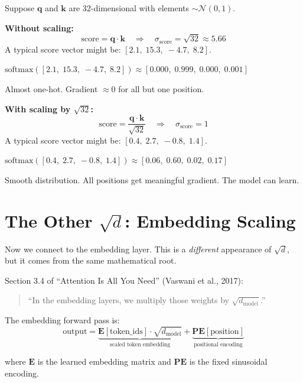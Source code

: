 \documentclass[11pt, a4paper]{article}
\begin{document}
\begin{application}[Numerical example with our $d_k = 32$]
Suppose $\bm{q}$ and $\bm{k}$ are 32-dimensional with elements $\sim \mathcal{N}(0, 1)$.

\medskip
\noindent \textbf{Without scaling:}
\[
\text{score} = \bm{q} \cdot \bm{k} \quad\Rightarrow\quad \sigma_\text{score} = \sqrt{32} \approx 5.66
\]
A typical score vector might be: $[2.1,\; 15.3,\; -4.7,\; 8.2]$.

$\text{softmax}([2.1,\; 15.3,\; -4.7,\; 8.2]) \approx [0.000,\; 0.999,\; 0.000,\; 0.001]$

Almost one-hot. Gradient $\approx 0$ for all but one position.

\medskip
\noindent \textbf{With scaling by $\sqrt{32}$:}
\[
\text{score} = \frac{\bm{q} \cdot \bm{k}}{\sqrt{32}} \quad\Rightarrow\quad \sigma_\text{score} = 1
\]
A typical score vector might be: $[0.4,\; 2.7,\; -0.8,\; 1.4]$.

$\text{softmax}([0.4,\; 2.7,\; -0.8,\; 1.4]) \approx [0.06,\; 0.60,\; 0.02,\; 0.17]$

Smooth distribution. All positions get meaningful gradient. The model can learn.
\end{application}


\section{The Other $\sqrt{d}$: Embedding Scaling}

Now we connect to the embedding layer. This is a \emph{different} appearance of $\sqrt{d}$,
but it comes from the same mathematical root.

\begin{formaldef}
Section 3.4 of ``Attention Is All You Need'' (Vaswani et al., 2017):

\begin{quote}
``In the embedding layers, we multiply those weights by $\sqrt{d_\text{model}}$.''
\end{quote}

The embedding forward pass is:
\[
\text{output} = \underbrace{\bm{E}[\text{token\_ids}] \cdot \sqrt{d_\text{model}}}_{\text{scaled token embedding}} + \underbrace{\bm{PE}[\text{position}]}_{\text{positional encoding}}
\]

where $\bm{E}$ is the learned embedding matrix and $\bm{PE}$ is the fixed sinusoidal encoding.
\end{formaldef}
\end{document}
